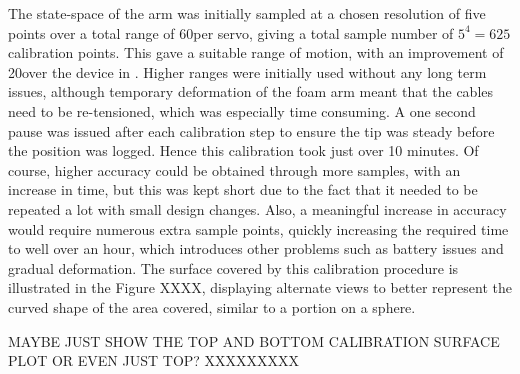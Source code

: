 \documentclass[11pt]{article}
\begin{document}
The state-space of the arm was initially sampled at a chosen resolution of five points over a total range of 60\degree per servo, giving a total sample number of $5^4 = 625$ calibration points. This gave a suitable range of motion, with an improvement of 20\degree over the device in \cite{GreggSmithDesign}. Higher ranges were initially used without any long term issues, although temporary deformation of the foam arm meant that the cables need to be re-tensioned, which was especially time consuming. A one second pause was issued after each calibration step to ensure the tip was steady before the position was logged. Hence this calibration took just over 10 minutes. Of course, higher accuracy could be obtained through more samples, with an increase in time, but this was kept short due to the fact that it needed to be repeated a lot with small design changes. Also, a meaningful increase in accuracy would require numerous extra sample points, quickly increasing the required time to well over an hour, which introduces other problems such as battery issues and gradual deformation. The surface covered by this calibration procedure is illustrated in the Figure XXXX, displaying alternate views to better represent the curved shape of the area covered, similar to a portion on a sphere.


MAYBE JUST SHOW THE TOP AND BOTTOM CALIBRATION SURFACE PLOT OR EVEN JUST TOP? XXXXXXXXX
\end{document}
